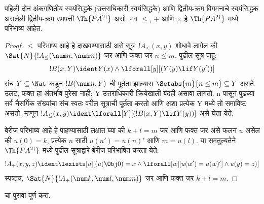 \documentclass[../../../include/open-logic-section]{subfiles}
\begin{document}
\begin{prop}
पहिली दोन अंकगणितीय स्वयंसिद्धके (उत्तराधिकारी स्वयंसिद्धके)
आणि द्वितीय-क्रम विगमनाचे स्वयंसिद्धक असलेली द्वितीय-क्रम
उपपत्ती $\Th{PA^{2\dagger}}$ असो. मग $\le$, $+$ आणि
$\times$ हे $\Th{PA^{2\dagger}}$ मध्ये परिभाष्य आहेत.
\end{prop}

\begin{proof}
$\le$ परिभाष्य आहे हे दाखवण्यासाठी असे
सूत्र~$!A_\le(x, y)$ शोधावे लागेल की
$\Sat{N}{!A_\le(\num n, \num m)}$ जर आणि फक्त जर
$n \le m$. पुढील सूत्र पाहू:
\[
!B(x, Y) \ident Y(x) \land \lforall[y][(Y(y) \lif Y(y'))]
\]
संच $Y \subseteq \Nat$ कडून $!B(\num n, Y)$ ची
पूर्तता झाल्यास $\Setabs{m}{n \le m} \subseteq Y$ असते.
उलट, फक्त हा अंतर्भाव पुरेसा नाही; Y उत्तराधिकारी क्रियेखाली
बंदही असावा लागतो. n पासून पुढच्या सर्व नैसर्गिक संख्यांचा
संच स्वतः वरील सूत्राची पूर्तता करतो आणि अशा प्रत्येक Y मध्ये
तो समाविष्ट असतो. म्हणून
$!A_\le(x, y) \ident
\lforall[Y][(!B(x, Y) \lif Y(y))]$ असे घेता येते.

बेरीज परिभाष्य आहे हे पाहण्यासाठी लक्षात घ्या की $k+l=m$
जर आणि फक्त जर असे फलन $u$ असेल की $u(0)=k$,
प्रत्येक $n$ साठी $u(n')=u(n)'$ आणि $m = u(l)$.
या समतुल्यतेने $\Th{PA^{2\dagger}}$ मध्ये पुढील
सूत्राद्वारे बेरीज परिभाषित करता येते:
\[
!A_+(x,y,z) \ident \lexists[u][(u(\Obj 0)=x \land \lforall[w][u(w')=u
 (w)'] \land u(y)=z)]
\]
स्पष्टच, $\Sat{N}{!A_+(\num k, \num l, \num m)}$
जर आणि फक्त जर $k+l=m$.
\end{proof}

\begin{prob}
 चा पुरावा पूर्ण करा.
\end{prob}
\end{document}
